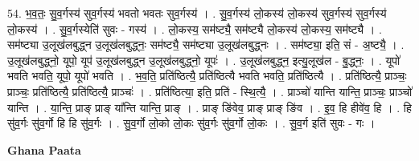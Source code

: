 \documentclass[17pt]{extarticle}
\begin{document}
54. भ॒व॒तः॒ सु॒व॒र्गस्य॑ सुव॒र्गस्य॑ भवतो भवतः सुव॒र्गस्य॑ । . सु॒व॒र्गस्य॑ लो॒कस्य॑ लो॒कस्य॑ सुव॒र्गस्य॑ सुव॒र्गस्य॑ लो॒कस्य॑ । . सु॒व॒र्गस्येति॑ सुवः - गस्य॑ । . लो॒कस्य॒ सम॑ष्ट्यै॒ सम॑ष्ट्यै लो॒कस्य॑ लो॒कस्य॒ सम॑ष्ट्यै । . सम॑ष्ट्या उ॒लूख॑लबुद्ध्न उ॒लूख॑लबुद्ध्नः॒ सम॑ष्ट्यै॒ सम॑ष्ट्या उ॒लूख॑लबुद्ध्नः । . सम॑ष्ट्या॒ इति॒ सं - अ॒ष्ट्यै॒ । . उ॒लूख॑लबुद्ध्नो॒ यूपो॒ यूप॑ उ॒लूख॑लबुद्ध्न उ॒लूख॑लबुद्ध्नो॒ यूपः॑ । . उ॒लूख॑लबुद्ध्न॒ इत्यु॒लूख॑ल - बु॒द्ध्नः॒ । . यूपो॑ भवति भवति॒ यूपो॒ यूपो॑ भवति । . भ॒व॒ति॒ प्रति॑ष्ठित्यै॒ प्रति॑ष्ठित्यै भवति भवति॒ प्रति॑ष्ठित्यै । . प्रति॑ष्ठित्यै॒ प्राञ्चः॒ प्राञ्चः॒ प्रति॑ष्ठित्यै॒ प्रति॑ष्ठित्यै॒ प्राञ्चः॑ । . प्रति॑ष्ठित्या॒ इति॒ प्रति॑ - स्थि॒त्यै॒ । . प्राञ्चो॑ यान्ति यान्ति॒ प्राञ्चः॒ प्राञ्चो॑ यान्ति । . या॒न्ति॒ प्राङ् प्राङ् या᳚न्ति यान्ति॒ प्राङ् । . प्राङ् ङि॑वेव॒ प्राङ् प्राङ् ङि॑व । . इ॒व॒ हि हीवे॑व॒ हि । . हि सु॑व॒र्गः सु॑व॒र्गो हि हि सु॑व॒र्गः । . सु॒व॒र्गो लो॒को लो॒कः सु॑व॒र्गः सु॑व॒र्गो लो॒कः । . सु॒व॒र्ग इति॑ सुवः - गः । \newline

\textbf{Ghana Paata } \newline
\end{document}
